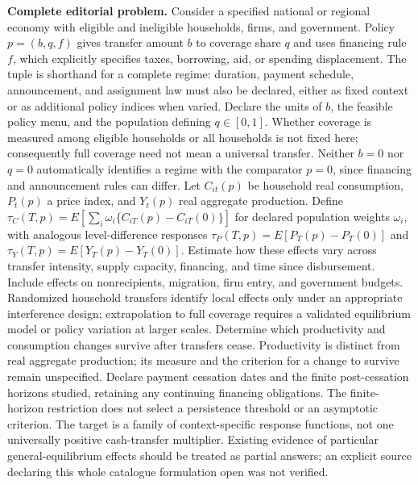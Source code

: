 \documentclass[11pt,a4paper]{article}
\begin{document}
\textbf{Complete editorial problem.} Consider a specified national or regional economy with eligible and ineligible households, firms, and government. Policy \(p=(b,q,f)\) gives transfer amount \(b\) to coverage share \(q\) and uses financing rule \(f\), which explicitly specifies taxes, borrowing, aid, or spending displacement. The tuple is shorthand for a complete regime: duration, payment schedule, announcement, and assignment law must also be declared, either as fixed context or as additional policy indices when varied. Declare the units of \(b\), the feasible policy menu, and the population defining \(q\in[0,1]\). Whether coverage is measured among eligible households or all households is not fixed here; consequently full coverage need not mean a universal transfer. Neither \(b=0\) nor \(q=0\) automatically identifies a regime with the comparator \(p=0\), since financing and announcement rules can differ. Let \(C_{it}(p)\) be household real consumption, \(P_t(p)\) a price index, and \(Y_t(p)\) real aggregate production. Define \(\tau_C(T,p)=E[\sum_i\omega_i\{C_{iT}(p)-C_{iT}(0)\}]\) for declared population weights \(\omega_i\), with analogous level-difference responses \(\tau_P(T,p)=E[P_T(p)-P_T(0)]\) and \(\tau_Y(T,p)=E[Y_T(p)-Y_T(0)]\). Estimate how these effects vary across transfer intensity, supply capacity, financing, and time since disbursement. Include effects on nonrecipients, migration, firm entry, and government budgets. Randomized household transfers identify local effects only under an appropriate interference design; extrapolation to full coverage requires a validated equilibrium model or policy variation at larger scales. Determine which productivity and consumption changes survive after transfers cease. Productivity is distinct from real aggregate production; its measure and the criterion for a change to survive remain unspecified. Declare payment cessation dates and the finite post-cessation horizons studied, retaining any continuing financing obligations. The finite-horizon restriction does not select a persistence threshold or an asymptotic criterion. The target is a family of context-specific response functions, not one universally positive cash-transfer multiplier. Existing evidence of particular general-equilibrium effects should be treated as partial answers; an explicit source declaring this whole catalogue formulation open was not verified.
\end{document}
